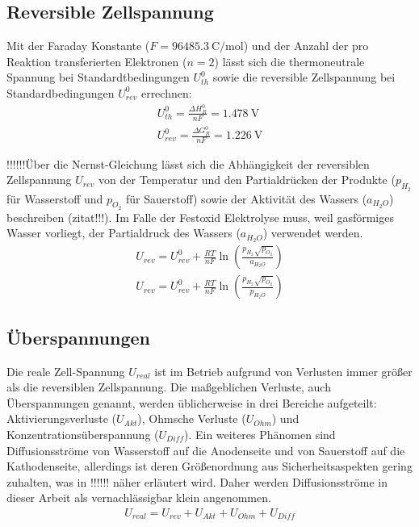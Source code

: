 \subsection{Reversible Zellspannung}
\label{subsubsec:Zellspannung}
Mit der Faraday Konstante ($F=\SI{96485,3}{\coulomb\per\mol}$) und der Anzahl der pro Reaktion transferierten Elektronen ($n = 2$) lässt sich die thermoneutrale Spannung bei Standardtbedingungen $U^0_{th}$ sowie die reversible Zellspannung bei Standardbedingungen $U^0_{rev}$ errechnen:
\begin{align}
 U^0_{th} = \frac{\Delta H^0_R}{nF} = \SI{1,478}{\volt}\\
 U^0_{rev} = \frac{\Delta G^0_R}{nF} = \SI{1,226}{\volt}
\end{align}

!!!!!!Über die Nernst-Gleichung lässt sich die Abhängigkeit der reversiblen Zellspannung $U_{rev}$ von der Temperatur und den Partialdrücken der Produkte ($p_{H_2}$ für Wasserstoff und $p_{O_2}$ für Sauerstoff) sowie der Aktivität des Wassers ($a_{H_{2}O}$) beschreiben (zitat!!!). Im Falle der Festoxid Elektrolyse muss, weil gasförmiges Wasser vorliegt, der Partialdruck des Wassers ($a_{H_{2}O}$) verwendet werden.
\begin{align}
 U_{rev} =  U^0_{rev} + \frac{RT}{nF}\ln{(\frac{p_{H_2}\sqrt{p_{O_2}}}{a_{H_{2}O}})} \\
 U_{rev} =  U^0_{rev} + \frac{RT}{nF}\ln{(\frac{p_{H_2}\sqrt{p_{O_2}}}{p_{H_{2}O}})}
\end{align}

\subsection{Überspannungen}
\label{subsubsec:Überspannungen}
Die reale Zell-Spannung $U_{real}$ ist im Betrieb aufgrund von Verlusten immer größer als die reversiblen Zellspannung. Die maßgeblichen Verluste, auch Überspannungen genannt, werden üblicherweise in drei Bereiche aufgeteilt: Aktivierungsverluste ($U_{Akt}$), Ohmsche Verluste ($U_{Ohm}$) und Konzentrationsüberspannung ($U_{Diff}$)\cite{guideline}. Ein weiteres Phänomen sind Diffusionsströme von Wasserstoff auf die Anodenseite und von Sauerstoff auf die Kathodenseite, allerdings ist deren Größenordnung aus Sicherheitsaspekten gering zuhalten, was in !!!!!! näher erläutert wird. Daher werden Diffusionsströme in dieser Arbeit als vernachlässigbar klein angenommen. 
\begin{align}
 U_{real} =  U_{rev} + U_{Akt} + U_{Ohm} + U_{Diff}
\end{align}   
